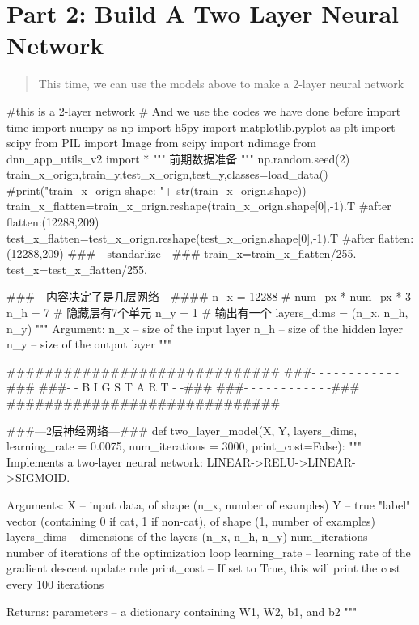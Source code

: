 \documentclass[12pt,a4paper]{article}
\begin{document}
	\section{Part 2: Build A Two Layer Neural Network}
		\begin{abstract}
			This time, we can use the models above to make a 2-layer neural network
		\end{abstract}
		\begin{python}
			#this is a 2-layer network
			# And we use the codes we have done before
			import time
			import numpy as np
			import h5py
			import matplotlib.pyplot as plt
			import scipy
			from PIL import Image
			from scipy import ndimage
			from dnn_app_utils_v2 import *
			""" 前期数据准备 """
			np.random.seed(2)
			train_x_orign,train_y,test_x_orign,test_y,classes=load_data()
			#print("train_x_orign shape: "+ str(train_x_orign.shape))
			train_x_flatten=train_x_orign.reshape(train_x_orign.shape[0],-1).T 
			#after flatten:(12288,209)
			test_x_flatten=test_x_orign.reshape(test_x_orign.shape[0],-1).T 
			#after flatten:(12288,209)
			###---standarlize---###
			train_x=train_x_flatten/255.
			test_x=test_x_flatten/255.
			
			###---内容决定了是几层网络---####
			n_x = 12288 # num_px * num_px * 3
			n_h = 7     # 隐藏层有7个单元
			n_y = 1     # 输出有一个
			layers_dims = (n_x, n_h, n_y)
			"""
			Argument:
			n_x -- size of the input layer
			n_h -- size of the hidden layer
			n_y -- size of the output layer
			"""
			
			#############################
			###- - - - - - - - - - - -###
			###- - B I G S T A R T - -###
			###- - - - - - - - - - - -###
			#############################
			
			
			###---2层神经网络---###
			def two_layer_model(X, Y, layers_dims, learning_rate = 0.0075, num_iterations = 3000, print_cost=False):
			"""
			Implements a two-layer neural network: LINEAR->RELU->LINEAR->SIGMOID.
			
			Arguments:
			X -- input data, of shape (n_x, number of examples)
			Y -- true "label" vector (containing 0 if cat, 1 if non-cat), of shape (1, number of examples)
			layers_dims -- dimensions of the layers (n_x, n_h, n_y)
			num_iterations -- number of iterations of the optimization loop
			learning_rate -- learning rate of the gradient descent update rule
			print_cost -- If set to True, this will print the cost every 100 iterations
			
			Returns:
			parameters -- a dictionary containing W1, W2, b1, and b2
			"""
			

\end{python}
\end{document}
